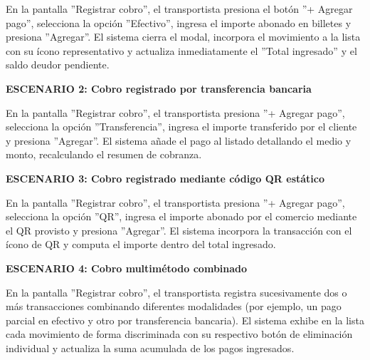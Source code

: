 \documentclass[a4paper,9pt]{article}
\begin{document}
\begin{tcolorbox}[hucard, title={\textbf{HU-31: REGISTRAR COBRANZA} \hfill \scriptsize \colorbox{slatestatus}{\textbf{\ Done\ }} \quad \colorbox{white}{\textcolor{primarydark}{\textbf{\ 5 pts\ }}}}]
{En la pantalla ''Registrar cobro'', el transportista presiona el botón ''+ Agregar pago'', selecciona la opción ''Efectivo'', ingresa el importe abonado en billetes y presiona ''Agregar''. El sistema cierra el modal, incorpora el movimiento a la lista con su ícono representativo y actualiza inmediatamente el ''Total ingresado'' y el saldo deudor pendiente.\par\vspace{2.5pt}
\noindent\textbf{\textcolor{secondarydark}{ESCENARIO 2:  Cobro registrado por transferencia bancaria}}\par\vspace{1pt}
En la pantalla ''Registrar cobro'', el transportista presiona ''+ Agregar pago'', selecciona la opción ''Transferencia'', ingresa el importe transferido por el cliente y presiona ''Agregar''. El sistema añade el pago al listado detallando el medio y monto, recalculando el resumen de cobranza.\par\vspace{2.5pt}
\noindent\textbf{\textcolor{secondarydark}{ESCENARIO 3:  Cobro registrado mediante código QR estático}}\par\vspace{1pt}
En la pantalla ''Registrar cobro'', el transportista presiona ''+ Agregar pago'', selecciona la opción ''QR'', ingresa el importe abonado por el comercio mediante el QR provisto y presiona ''Agregar''. El sistema incorpora la transacción con el ícono de QR y computa el importe dentro del total ingresado.\par\vspace{2.5pt}
\noindent\textbf{\textcolor{secondarydark}{ESCENARIO 4:  Cobro multimétodo combinado}}\par\vspace{1pt}
En la pantalla ''Registrar cobro'', el transportista registra sucesivamente dos o más transacciones combinando diferentes modalidades (por ejemplo, un pago parcial en efectivo y otro por transferencia bancaria). El sistema exhibe en la lista cada movimiento de forma discriminada con su respectivo botón de eliminación individual y actualiza la suma acumulada de los pagos ingresados.\par\vspace{2.5pt}
}\par
\end{tcolorbox}
\end{document}
